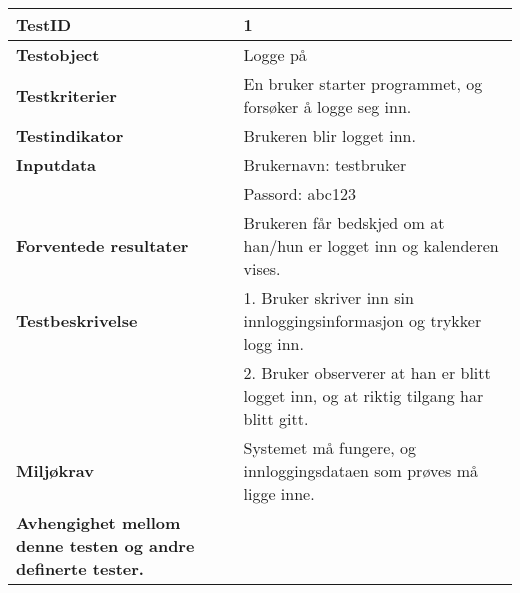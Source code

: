 

	\begin{tabularx}{1.2\textwidth}{| p{5cm} | X |}
	\hline
	\textbf{TestID} 																& 1																	\\ \hline
	\textbf{Testobject} 															& Logge på															\\ \hline
	\textbf{Testkriterier} 															& En bruker starter programmet, og forsøker å logge seg inn.							\\ \hline
	\textbf{Testindikator} 															& Brukeren blir logget inn.													\\ \hline
	\textbf{Inputdata} 															& Brukernavn: testbruker													\\ 
																			& Passord: abc123														\\  \hline
	\textbf{Forventede resultater}									 				& Brukeren får bedskjed om at han/hun er logget inn og kalenderen vises.				\\ \hline
	\textbf{Testbeskrivelse} 														& 1. Bruker skriver inn sin innloggingsinformasjon og trykker logg inn.					\\
																			& 2. Bruker observerer at han er blitt logget inn, og at riktig tilgang har blitt gitt.			\\ \hline
	\textbf{Miljøkrav}			 												& Systemet må fungere, og innloggingsdataen som prøves må ligge inne.				\\ \hline
	\textbf{Avhengighet mellom denne testen og andre definerte tester.}		 				&				 													\\ \hline
	\end{tabularx}

\mbox{}\\

